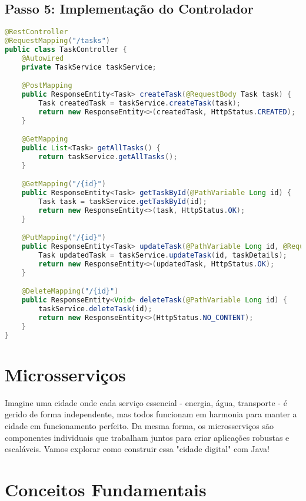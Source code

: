 \documentclass[a4paper,12pt]{book}
\begin{document}
\subsection{Passo 5: Implementação do Controlador}

\begin{lstlisting}[language=Java]
@RestController
@RequestMapping("/tasks")
public class TaskController {
    @Autowired
    private TaskService taskService;

    @PostMapping
    public ResponseEntity<Task> createTask(@RequestBody Task task) {
        Task createdTask = taskService.createTask(task);
        return new ResponseEntity<>(createdTask, HttpStatus.CREATED);
    }

    @GetMapping
    public List<Task> getAllTasks() {
        return taskService.getAllTasks();
    }

    @GetMapping("/{id}")
    public ResponseEntity<Task> getTaskById(@PathVariable Long id) {
        Task task = taskService.getTaskById(id);
        return new ResponseEntity<>(task, HttpStatus.OK);
    }

    @PutMapping("/{id}")
    public ResponseEntity<Task> updateTask(@PathVariable Long id, @RequestBody Task taskDetails) {
        Task updatedTask = taskService.updateTask(id, taskDetails);
        return new ResponseEntity<>(updatedTask, HttpStatus.OK);
    }

    @DeleteMapping("/{id}")
    public ResponseEntity<Void> deleteTask(@PathVariable Long id) {
        taskService.deleteTask(id);
        return new ResponseEntity<>(HttpStatus.NO_CONTENT);
    }
}
\end{lstlisting}

\section{Microsserviços}
Imagine uma cidade onde cada serviço essencial - energia, água, transporte - é gerido de forma independente, mas todos funcionam em harmonia para manter a cidade em funcionamento perfeito. Da mesma forma, os microsserviços são componentes individuais que trabalham juntos para criar aplicações robustas e escaláveis. Vamos explorar como construir essa "cidade digital" com Java!

\section{Conceitos Fundamentais}
\end{document}
